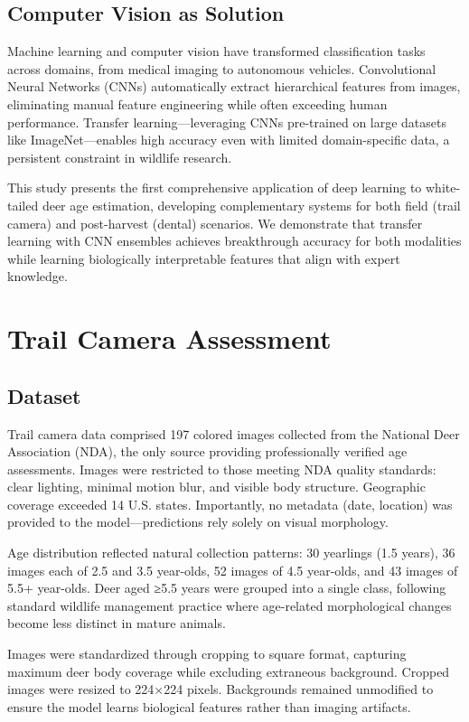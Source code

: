 \documentclass[11pt]{article}
\begin{document}
\subsection{Computer Vision as Solution}

Machine learning and computer vision have transformed classification tasks across domains, from medical imaging to autonomous vehicles. Convolutional Neural Networks (CNNs) automatically extract hierarchical features from images, eliminating manual feature engineering while often exceeding human performance. Transfer learning—leveraging CNNs pre-trained on large datasets like ImageNet—enables high accuracy even with limited domain-specific data, a persistent constraint in wildlife research.

This study presents the first comprehensive application of deep learning to white-tailed deer age estimation, developing complementary systems for both field (trail camera) and post-harvest (dental) scenarios. We demonstrate that transfer learning with CNN ensembles achieves breakthrough accuracy for both modalities while learning biologically interpretable features that align with expert knowledge.

\section{Trail Camera Assessment}

\subsection{Dataset}

Trail camera data comprised 197 colored images collected from the National Deer Association (NDA), the only source providing professionally verified age assessments. Images were restricted to those meeting NDA quality standards: clear lighting, minimal motion blur, and visible body structure. Geographic coverage exceeded 14 U.S. states. Importantly, no metadata (date, location) was provided to the model—predictions rely solely on visual morphology.

Age distribution reflected natural collection patterns: 30 yearlings (1.5 years), 36 images each of 2.5 and 3.5 year-olds, 52 images of 4.5 year-olds, and 43 images of 5.5+ year-olds. Deer aged ≥5.5 years were grouped into a single class, following standard wildlife management practice where age-related morphological changes become less distinct in mature animals.

Images were standardized through cropping to square format, capturing maximum deer body coverage while excluding extraneous background. Cropped images were resized to 224×224 pixels. Backgrounds remained unmodified to ensure the model learns biological features rather than imaging artifacts.
\end{document}
